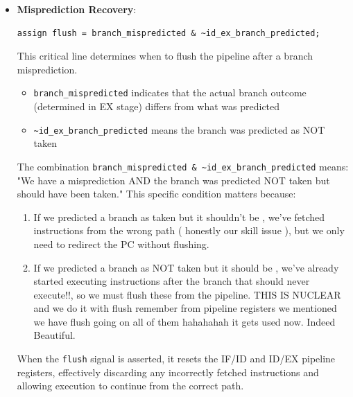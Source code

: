 \documentclass{article}
\numberwithin{figure}{section}
\numberwithin{table}{section}
\begin{document}
\begin{itemize}
\item \textbf{Misprediction Recovery}:

\begin{lstlisting}[style=verilog-style]
assign flush = branch_mispredicted & ~id_ex_branch_predicted;\end{lstlisting}

    This critical line determines when to flush the pipeline after a branch misprediction. 
    
    \begin{itemize}
        \item \texttt{branch\_mispredicted} indicates that the actual branch outcome (determined in EX stage) differs from what was predicted
        \item \texttt{\textasciitilde id\_ex\_branch\_predicted} means the branch was predicted as NOT taken
    \end{itemize}
    
    The combination \texttt{branch\_mispredicted \& \textasciitilde id\_ex\_branch\_predicted} means: "We have a misprediction AND the branch was predicted NOT taken but should have been taken." This specific condition matters because:
    
    \begin{enumerate}
        \item If we predicted a branch as taken but it shouldn't be , we've fetched instructions from the wrong path ( honestly our skill issue ), but we only need to redirect the PC without flushing.
        \item If we predicted a branch as NOT taken but it should be , we've already started executing instructions after the branch that should never execute!!, so we must flush these from the pipeline. THIS IS NUCLEAR and we do it with flush remember from pipeline registers we mentioned we have flush going on all of them hahahahah it gets used now. Indeed Beautiful.
    \end{enumerate}
    
    When the \texttt{flush} signal is asserted, it resets the IF/ID and ID/EX pipeline registers, effectively discarding any incorrectly fetched instructions and allowing execution to continue from the correct path.
\end{itemize}
\end{document}
